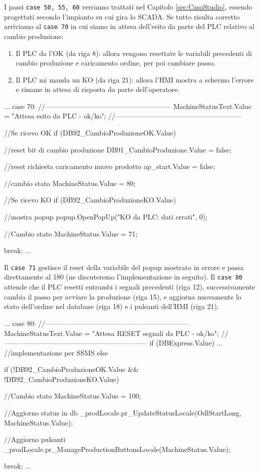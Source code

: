 I passi \verb|case 50, 55, 60| verranno trattati nel Capitolo \ref{sec:CasoStudio}, essendo progettati secondo l'impianto su cui gira lo SCADA. Se tutto risulta corretto arriviamo al \verb|case 70| in cui siamo in attesa dell'esito da parte del PLC relativo al cambio produzione:
\begin{enumerate}
    \item Il PLC da l'OK (da riga 8): allora vengono resettate le variabili precedenti di cambio produzione e caricamento ordine, per poi cambiare passo.
    \item Il PLC mi manda un KO (da riga 21): allora l'HMI mostra a schermo l'errore e rimane in attesa di risposta da parte dell'operatore.
\end{enumerate}
\begin{csharp}
...
    case 70:
    //------------------------------------------------------
    MachineStatusText.Value = "Attesa esito da PLC - ok/ko";
    //------------------------------------------------------

    //Se ricevo OK
    if (DB92_CambioProduzioneOK.Value)
    {
        //reset bit di cambio produzione
        DB91_CambioProduzione.Value = false;

        //reset richiesta caricamento nuovo prodotto
        ap_start.Value = false;

        //cambio stato
        MachineStatus.Value = 80;
    }

    //Se ricevo KO
    if (DB92_CambioProduzioneKO.Value)
    {
        //mostra popup
        popup.OpenPopUp("KO da PLC: dati errati", 0);

        //Cambio stato
        MachineStatus.Value = 71;
    }

    break;
...
\end{csharp}
Il \verb|case 71| gestisce il reset della variabile del popup mostrato in errore e passa direttamente al 180 (ne discuteremo l'implementazione in seguito). Il \verb|case 80| attende che il PLC resetti entrambi i segnali precedenti (riga 12), successivamente cambia il passo per avviare la produzione (riga 15), e aggiorna nuovamente lo stato dell'ordine nel database (riga 18) e i pulsanti dell'HMI (riga 21).
\begin{csharp}
...
    case 80:
    //--------------------------------------------------------------
    MachineStatusText.Value = "Attesa RESET segnali da PLC - ok/ko";
    //--------------------------------------------------------------
    if (DBExpress.Value)
    {
        ... //implementazione per SSMS
    }
    else
    {
        if (!DB92_CambioProduzioneOK.Value && !DB92_CambioProduzioneKO.Value)
        {
            //Cambio stato
            MachineStatus.Value = 100;

            //Aggiorno status in db
            _prodLocale.pr_UpdateStatusLocale(OdlStartLong, MachineStatus.Value);

            //Aggiorno pulsanti
            _prodLocale.pr_ManageProductionButtonsLocale(MachineStatus.Value);
        }
    }
    
    break;
...
\end{csharp}
